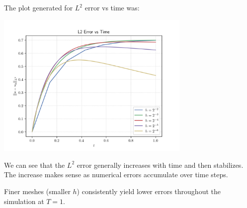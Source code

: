 \documentclass[12pt]{article}
\begin{document}
The plot generated for $L^2$ error vs time was:
\begin{center}
\includegraphics[width=0.7\textwidth]{../outputs_3/burgers_rk4_error_vs_time.png}
\end{center}

We can see that the $L^2$ error generally increases with time and then stabilizes. The increase makes sense as numerical errors accumulate over time steps.
 
Finer meshes (smaller $h$) consistently yield lower errors throughout the simulation at $T=1$.
\end{document}
